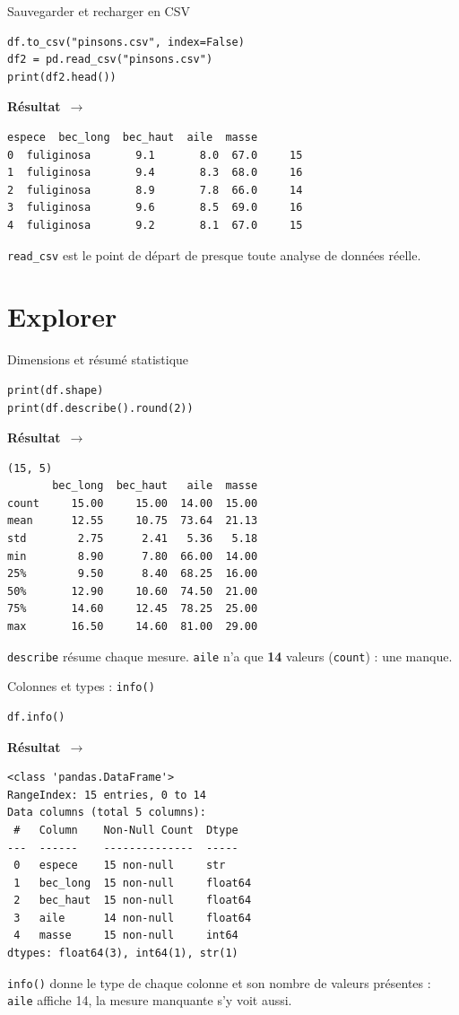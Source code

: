 \documentclass[aspectratio=169,11pt]{beamer}
\newcommand{\resultat}{{\scriptsize\textbf{R\'esultat}~$\rightarrow$}\par\vspace{1pt}}
\begin{document}
\begin{frame}[fragile]{Sauvegarder et recharger en CSV}
\begin{lstlisting}
df.to_csv("pinsons.csv", index=False)
df2 = pd.read_csv("pinsons.csv")
print(df2.head())
\end{lstlisting}
\resultat
\begin{lstlisting}[style=out]
       espece  bec_long  bec_haut  aile  masse
0  fuliginosa       9.1       8.0  67.0     15
1  fuliginosa       9.4       8.3  68.0     16
2  fuliginosa       8.9       7.8  66.0     14
3  fuliginosa       9.6       8.5  69.0     16
4  fuliginosa       9.2       8.1  67.0     15
\end{lstlisting}
{\small \texttt{read\_csv} est le point de départ de presque toute analyse de données réelle.}
\end{frame}

\section{Explorer}

\begin{frame}[fragile]{Dimensions et résumé statistique}
\begin{lstlisting}
print(df.shape)
print(df.describe().round(2))
\end{lstlisting}
\resultat
\begin{lstlisting}[style=out]
(15, 5)
       bec_long  bec_haut   aile  masse
count     15.00     15.00  14.00  15.00
mean      12.55     10.75  73.64  21.13
std        2.75      2.41   5.36   5.18
min        8.90      7.80  66.00  14.00
25%        9.50      8.40  68.25  16.00
50%       12.90     10.60  74.50  21.00
75%       14.60     12.45  78.25  25.00
max       16.50     14.60  81.00  29.00
\end{lstlisting}
{\small \texttt{describe} résume chaque mesure. \texttt{aile} n'a que \textbf{14} valeurs (\texttt{count}) : une manque.}
\end{frame}

\begin{frame}[fragile]{Colonnes et types : \texttt{info()}}
\begin{lstlisting}
df.info()
\end{lstlisting}
\resultat
\begin{lstlisting}[style=out]
<class 'pandas.DataFrame'>
RangeIndex: 15 entries, 0 to 14
Data columns (total 5 columns):
 #   Column    Non-Null Count  Dtype
---  ------    --------------  -----
 0   espece    15 non-null     str
 1   bec_long  15 non-null     float64
 2   bec_haut  15 non-null     float64
 3   aile      14 non-null     float64
 4   masse     15 non-null     int64
dtypes: float64(3), int64(1), str(1)
\end{lstlisting}
{\small \texttt{info()} donne le type de chaque colonne et son nombre de valeurs présentes : \texttt{aile} affiche 14, la mesure manquante s'y voit aussi.}
\end{frame}
\end{document}
